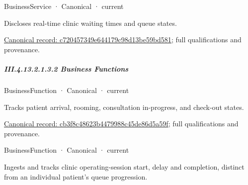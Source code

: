 \label{navigation:III.4.13.2.1.3.1.1}

\label{element:c720457349e644179c98d13be59bd581}
{\small BusinessService · Canonical · current}\par

Discloses real-time clinic waiting times and queue states.


{\footnotesize \href{../../../../../../../../continuum/business/business-service/c720457349e644179c98d13be59bd581.md}{Canonical record: c720457349e644179c98d13be59bd581}; full qualifications and provenance.}\par
\subparagraph*{III.4.13.2.1.3.2 Business Functions}
\label{navigation:III.4.13.2.1.3.2}

\label{navigation:III.4.13.2.1.3.2.1}

\label{element:cb3f8c48623b4479988c45de86d5a59f}
{\small BusinessFunction · Canonical · current}\par

Tracks patient arrival, rooming, consultation in-progress, and check-out states.


{\footnotesize \href{../../../../../../../../continuum/business/business-function/cb3f8c48623b4479988c45de86d5a59f.md}{Canonical record: cb3f8c48623b4479988c45de86d5a59f}; full qualifications and provenance.}\par
{}
\label{navigation:III.4.13.2.1.3.2.2}

\label{element:83a85a08803c4c00b8de4a38e8c9d77e}
{\small BusinessFunction · Canonical · current}\par

Ingests and tracks clinic operating-session start, delay and completion, distinct from an individual patient's queue progression.



